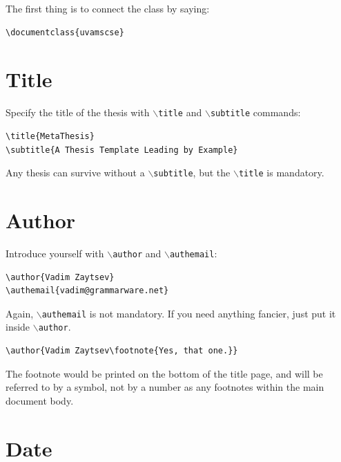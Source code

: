 \documentclass{uvamscse}
\newcommand{\cmd}[1]{\texttt{$\backslash$#1}}
\begin{document}
The first thing is to connect the class by saying:

\begin{snippet}
\begin{verbatim}
\documentclass{uvamscse}
\end{verbatim}
\end{snippet}

\section{Title}

Specify the title of the thesis with \cmd{title} and \cmd{subtitle} commands:

\begin{snippet}
\begin{verbatim}
\title{MetaThesis}
\subtitle{A Thesis Template Leading by Example}
\end{verbatim}
\end{snippet}

Any thesis can survive without a \cmd{subtitle}, but the \cmd{title} is mandatory.

\section{Author}

Introduce yourself with \cmd{author} and \cmd{authemail}:

\begin{snippet}
\begin{verbatim}
\author{Vadim Zaytsev}
\authemail{vadim@grammarware.net}
\end{verbatim}
\end{snippet}

Again, \cmd{authemail} is not mandatory. If you need anything fancier, just put it inside \cmd{author}.

\begin{snippet}
\begin{verbatim}
\author{Vadim Zaytsev\footnote{Yes, that one.}}
\end{verbatim}
\end{snippet}

The footnote would be printed on the bottom of the title page, and will be
referred to by a symbol, not by a number as any footnotes within the main
document body.

\section{Date}
\end{document}
